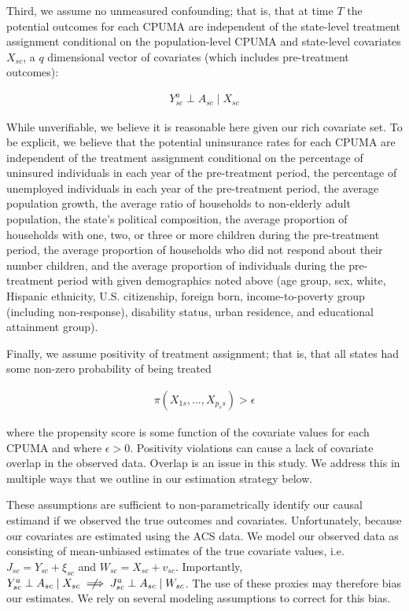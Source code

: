 \documentclass[aoas]{imsart}
\theoremstyle{plain}
\theoremstyle{remark}
\begin{document}
Third, we assume no unmeasured confounding; that is, that at time $T$ the potential outcomes for each CPUMA are independent of the state-level treatment assignment conditional on the population-level CPUMA and state-level covariates $X_{sc}$, a $q$ dimensional vector of covariates (which includes pre-treatment outcomes):

\begin{align*}
Y_{sc}^a \perp A_{sc} \mid X_{sc}
\end{align*}

While unverifiable, we believe it is reasonable here given our rich covariate set. To be explicit, we believe that the potential uninsurance rates for each CPUMA are independent of the treatment assignment conditional on the percentage of uninsured individuals in each year of the pre-treatment period, the percentage of unemployed individuals in each year of the pre-treatment period, the average population growth, the average ratio of households to non-elderly adult population, the state's political composition, the average proportion of households with one, two, or three or more children during the pre-treatment period, the average proportion of households who did not respond about their number children, and the average proportion of individuals during the pre-treatment period with given demographics noted above (age group, sex, white, Hispanic ethnicity, U.S. citizenship, foreign born, income-to-poverty group (including non-response), disability status, urban residence, and educational attainment group). 

Finally, we assume positivity of treatment assignment; that is, that all states had some non-zero probability of being treated 

\begin{align*}
\pi(X_{1s}, ..., X_{p_ss}) > \epsilon
\end{align*}

where the propensity score is some function of the covariate values for each CPUMA and where $\epsilon > 0$. Positivity violations can cause a lack of covariate overlap in the observed data. Overlap is an issue in this study. We address this in multiple ways that we outline in our estimation strategy below. 

These assumptions are sufficient to non-parametrically identify our causal estimand if we observed the true outcomes and covariates. Unfortunately, because our covariates are estimated using the ACS data. We model our observed data as consisting of mean-unbiased estimates of the true covariate values, i.e. $J_{sc} = Y_{sc} + \xi_{sc}$ and $W_{sc} = X_{sc} + v_{sc}$. Importantly, $Y_{sc}^a \perp A_{sc} \mid X_{sc} \centernot\implies J_{sc}^a \perp A_{sc} \mid W_{sc}$. The use of these proxies may therefore bias our estimates. We rely on several modeling assumptions to correct for this bias.
\end{document}
